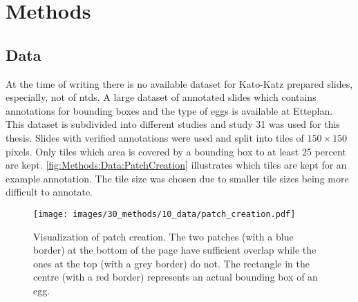 \chapter{Methods}
\label{ch:Methods}


\section{Data}
\label{sec:Methods:Data}

At the time of writing there is no available dataset for Kato-Katz prepared slides, especially, not of \acp{ntd}. A large dataset of annotated slides which contains annotations for bounding boxes and the type of eggs is available at Etteplan. This dataset is subdivided into different studies and study 31 was used for this thesis.  Slides with verified annotations were used and split into tiles of $150 \times 150$ pixels. Only tiles which area is covered by a bounding box to at least 25 percent are kept. \autoref{fig:Methods:Data:PatchCreation} illustrates which tiles are kept for an example annotation. The tile size was chosen due to smaller tile sizes being more difficult to annotate.

\begin{figure}
    \centering
    \texttt{[image: images/30\_methods/10\_data/patch\_creation.pdf]}
    \caption{Visualization of patch creation. The two patches (with a blue border) at the bottom of the page have sufficient overlap while the ones at the top (with a grey border) do not. The rectangle in the centre (with a red border) represents an actual bounding box of an egg.}
    \label{fig:Methods:Data:PatchCreation}
\end{figure}

